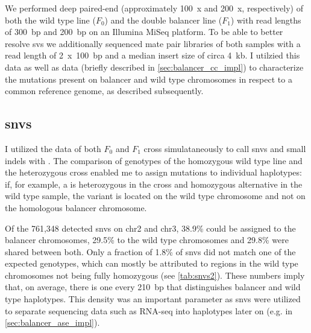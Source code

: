 We performed deep paired-end \wgs (approximately 100~x and 200~x, respectively)
of both the wild type line ($F_0$) and the double balancer line ($F_1$) with
read lengths of 300~bp and 200~bp on an Illumina MiSeq platform. To be able to
better resolve \acp{sv} we additionally sequenced mate pair libraries of both       
samples with a read length of 2~x~100~bp and a median insert size of circa 4~kb.
I utilzied this data as well as \hic data (briefly described in
\cref{sec:balancer_cc_impl}) to characterize the mutations present on balancer
and wild type chromosomes in respect to a common reference genome, as described
subsequently.


\subsection{\Aclp{snv}}
\label{sec:balancer_snvs}

I utilized the \wgs data of both $F_0$ and $F_1$ cross simulataneously to call
\acp{snv} and small indels with \freebayes. The comparison of genotypes of the
homozygous wild type line and the heterozygous cross enabled me to assign
mutations to individual haplotypes: if, for example, a \snv is heterozygous in
the cross and homozygous alternative in the wild type sample, the variant is
located on the wild type chromosome and not on the homologous balancer
chromosome.

Of the 761,348 detected \acp{snv} on \ac{chr2} and \ac{chr3}, 38.9\% could be
assigned to the balancer chromosomes, 29.5\% to the wild type chromosomes and
29.8\% were shared between both. Only a fraction of 1.8\% of \acp{snv} did not
match one of the expected genotypes, which can mostly be attributed to regions
in the wild type chromosomes not being fully homozygous (see \cref{tab:snvs2}).
These numbers imply that, on average, there is one \snv every 210~bp that
distinguishes balancer and wild type haplotypes. This density was an important
parameter as \acp{snv} were utilized to separate sequencing data such as
RNA-seq into haplotypes later on (e.g. in \cref{sec:balancer_ase_impl}).

